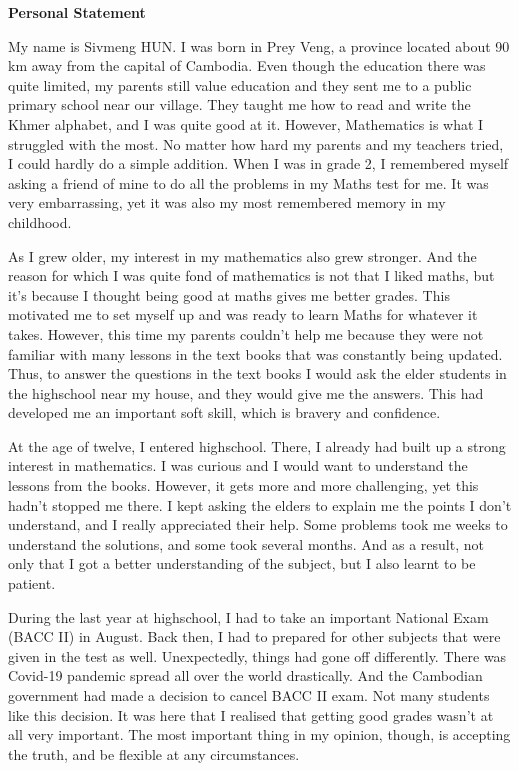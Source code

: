 \documentclass{article}
\begin{document}
\begin{center}
  {\Large\bfseries Personal Statement}
\end{center}

My name is Sivmeng HUN. I was born in Prey Veng, a province
located about 90 km away from the capital of Cambodia.
Even though the education there was quite limited, my parents 
still value education and they sent me to a public primary school
near our village. They taught me how to read and write the Khmer alphabet,
and I was quite good at it. However, Mathematics is what I struggled
with the most. No matter how hard my parents and my teachers tried, 
I could hardly do a simple addition. When I was in grade 2, I remembered 
myself asking a friend of mine to do all the problems in my Maths test 
for me. It was very embarrassing, yet it was also my most remembered 
memory in my childhood.

As I grew older, my interest in my mathematics also grew stronger.
And the reason for which I was quite fond of mathematics is not that
I liked maths, but it's because I thought being good at maths gives me
better grades. This motivated me to set myself up and was ready to 
learn Maths for whatever it takes.
However, this time my parents couldn't help me because
they were not familiar with many lessons in the text books that was
constantly being updated. 
Thus, to answer the questions in the text books
I would ask the elder students in the highschool near my house,
and they would give me the answers.
This had developed me an important soft skill, which is bravery
and confidence. 

At the age of twelve, I entered highschool. There, I already had built
up a strong interest in mathematics. I was curious and I would want to
understand the lessons from the books. However, it gets more and more
challenging, yet this hadn't stopped me there. I kept asking the elders 
to explain me the points I don't understand, and I really appreciated
their help. Some problems took me weeks to understand the solutions,
and some took several months.
And as a result, not only that I got a better understanding of the 
subject, but I also learnt to be patient.

During the last year at highschool, I had to take an important 
National Exam (BACC II) in August. Back then, I had to prepared for 
other subjects that were given in the test as well. Unexpectedly, 
things had gone off differently. There was Covid-19 pandemic spread 
all over the world drastically. And the Cambodian government had made a 
decision to cancel BACC II exam. Not many students like this decision. 
It was here that I realised that getting good grades 
wasn't at all very important. The most important thing 
in my opinion, though, is accepting the truth, and be flexible at 
any circumstances.
\end{document}
